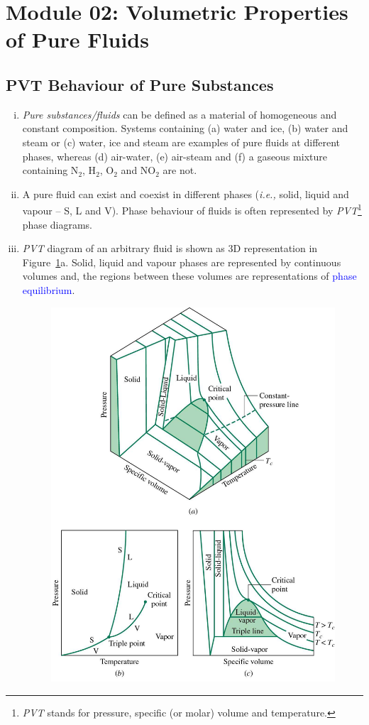 \documentclass[12pts,a4paper,amsmath,amssymb,floatfix]{article}%
\newcommand{\blue}{\textcolor{blue}}
\newcommand{\ie}{{\it i.e., }}
\begin{document}
\section{Module 02: Volumetric Properties of Pure Fluids}\label{Section:02}


\subsection{PVT Behaviour of Pure Substances}\label{Section:02:PVTBehaviour}
  
   \begin{enumerate}[i)]
%
       \item {\it Pure substances/fluids} can be defined as a material of homogeneous and constant composition. Systems containing (a) water and ice, (b) water and steam or (c) water, ice and steam are examples of pure fluids at different phases, whereas (d) air-water, (e) air-steam and (f) a gaseous mixture containing N$_{2}$, H$_{2}$, O$_{2}$ and NO$_{2}$ are not. 
%
       \item A pure fluid can exist and coexist in different phases (\ie solid, liquid and vapour -- S, L and V). Phase behaviour of fluids is often represented by {\it PVT}\footnote{{\it PVT} stands for pressure, specific (or molar) volume and temperature.} phase diagrams. 
%
       \item {\it PVT} diagram of an arbitrary fluid is shown as 3D representation in Figure~\ref{Mod02Fig01}a. Solid, liquid and vapour phases are represented by continuous volumes and, the regions between these volumes are representations of \blue{phase equilibrium}.
%
           \begin{figure}[h]
              \begin{center}
                 \includegraphics[width=10.cm,clip]{./../Pics/PVT_Surface.jpg}\label{Mod02Fig01}

\end{center}
\end{figure}
\end{enumerate}
\end{document}
